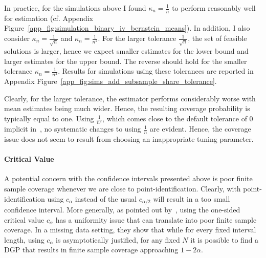 \documentclass[12pt,a4paper,english]{article} %
\numberwithin{equation}{section}
\theoremstyle{definition}
\theoremstyle{remark}
\theoremstyle{plain}
\begin{document}
In practice, for the simulations above I found $\kappa_n = \frac{1}{n}$ to perform reasonably well for estimation (cf. Appendix Figure~\ref{app_fig:simulation_binary_iv_bernstein_means}).
In addition, I also consider $\kappa_n = \frac{1}{\sqrt{n}}$ and $\kappa_n = \frac{1}{n^2}$.
For the larger tolerance $\frac{1}{\sqrt{n}}$, the set of feasible solutions is larger, hence we expect smaller estimates for the lower bound and larger estimates for the upper bound.
The reverse should hold for the smaller tolerance $\kappa_n = \frac{1}{n^2}$.
Results for simulations using these tolerances are reported in Appendix Figure~\ref{app_fig:sims_add_subsample_share_tolerance}.

Clearly, for the larger tolerance, the estimator performs considerably worse with mean estimates being much wider.
Hence, the resulting coverage probability is typically equal to one.
Using $\frac{1}{n^2}$, which comes close to the default tolerance of $0$ implicit in~\cite{shea2023ivmte}, no systematic changes to using $\frac{1}{n}$ are evident.
Hence, the coverage issue does not seem to result from choosing an inappropriate tuning parameter.

\paragraph{Critical Value}
A potential concern with the confidence intervals presented above is poor finite sample coverage whenever we are close to point-identification.
Clearly, with point-identification using $c_\alpha$ instead of the usual $c_{\alpha/2}$ will result in a too small confidence interval.
More generally, as pointed out by~\cite{imbens2004confidence}, using the one-sided critical value $c_\alpha$ has a uniformity issue that can translate into poor finite sample coverage.
In a missing data setting, they show that while for every fixed interval length, using $c_\alpha$ is asymptotically justified, for any fixed $N$ it is possible to find a DGP that results in finite sample coverage approaching $1-2\alpha$.
\end{document}
